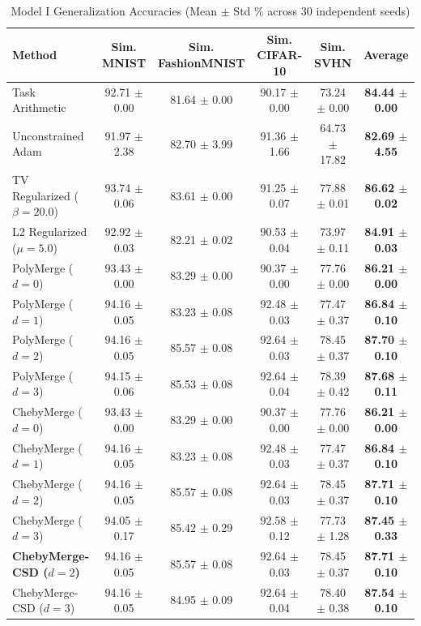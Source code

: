 \begin{table}[t]
\caption{Model I Generalization Accuracies (Mean $\pm$ Std \% across 30 independent seeds)}
\label{tab:model1_results}
\vskip 0.15in
\begin{center}
\begin{small}
\setlength{\tabcolsep}{4.5pt}
\begin{tabular}{lccccc}
\toprule
Method & Sim. MNIST & Sim. FashionMNIST & Sim. CIFAR-10 & Sim. SVHN & \textbf{Average} \\
\midrule
Task Arithmetic & 92.71 $\pm$ 0.00 & 81.64 $\pm$ 0.00 & 90.17 $\pm$ 0.00 & 73.24 $\pm$ 0.00 & \textbf{84.44 $\pm$ 0.00} \\
Unconstrained Adam & 91.97 $\pm$ 2.38 & 82.70 $\pm$ 3.99 & 91.36 $\pm$ 1.66 & 64.73 $\pm$ 17.82 & \textbf{82.69 $\pm$ 4.55} \\
TV Regularized ($\beta=20.0$) & 93.74 $\pm$ 0.06 & 83.61 $\pm$ 0.00 & 91.25 $\pm$ 0.07 & 77.88 $\pm$ 0.01 & \textbf{86.62 $\pm$ 0.02} \\
L2 Regularized ($\mu=5.0$) & 92.92 $\pm$ 0.03 & 82.21 $\pm$ 0.02 & 90.53 $\pm$ 0.04 & 73.97 $\pm$ 0.11 & \textbf{84.91 $\pm$ 0.03} \\
\midrule
PolyMerge ($d=0$) & 93.43 $\pm$ 0.00 & 83.29 $\pm$ 0.00 & 90.37 $\pm$ 0.00 & 77.76 $\pm$ 0.00 & \textbf{86.21 $\pm$ 0.00} \\
PolyMerge ($d=1$) & 94.16 $\pm$ 0.05 & 83.23 $\pm$ 0.08 & 92.48 $\pm$ 0.03 & 77.47 $\pm$ 0.37 & \textbf{86.84 $\pm$ 0.10} \\
PolyMerge ($d=2$) & 94.16 $\pm$ 0.05 & 85.57 $\pm$ 0.08 & 92.64 $\pm$ 0.03 & 78.45 $\pm$ 0.37 & \textbf{87.70 $\pm$ 0.10} \\
PolyMerge ($d=3$) & 94.15 $\pm$ 0.06 & 85.53 $\pm$ 0.08 & 92.64 $\pm$ 0.04 & 78.39 $\pm$ 0.42 & \textbf{87.68 $\pm$ 0.11} \\
\midrule
ChebyMerge ($d=0$) & 93.43 $\pm$ 0.00 & 83.29 $\pm$ 0.00 & 90.37 $\pm$ 0.00 & 77.76 $\pm$ 0.00 & \textbf{86.21 $\pm$ 0.00} \\
ChebyMerge ($d=1$) & 94.16 $\pm$ 0.05 & 83.23 $\pm$ 0.08 & 92.48 $\pm$ 0.03 & 77.47 $\pm$ 0.37 & \textbf{86.84 $\pm$ 0.10} \\
ChebyMerge ($d=2$) & 94.16 $\pm$ 0.05 & 85.57 $\pm$ 0.08 & 92.64 $\pm$ 0.03 & 78.45 $\pm$ 0.37 & \textbf{87.71 $\pm$ 0.10} \\
ChebyMerge ($d=3$) & 94.05 $\pm$ 0.17 & 85.42 $\pm$ 0.29 & 92.58 $\pm$ 0.12 & 77.73 $\pm$ 1.28 & \textbf{87.45 $\pm$ 0.33} \\
\midrule
\textbf{ChebyMerge-CSD ($d=2$)} & 94.16 $\pm$ 0.05 & 85.57 $\pm$ 0.08 & 92.64 $\pm$ 0.03 & 78.45 $\pm$ 0.37 & \textbf{87.71 $\pm$ 0.10} \\
ChebyMerge-CSD ($d=3$) & 94.16 $\pm$ 0.05 & 84.95 $\pm$ 0.09 & 92.64 $\pm$ 0.04 & 78.40 $\pm$ 0.38 & \textbf{87.54 $\pm$ 0.10} \\
\bottomrule
\end{tabular}
\end{small}
\end{center}
\vskip -0.1in
\end{table}

